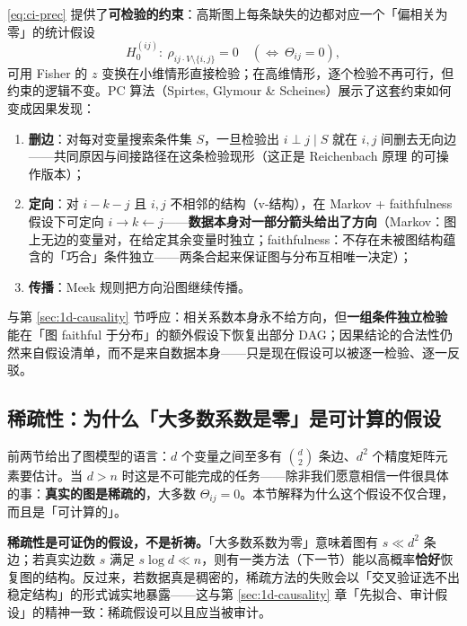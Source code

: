 \eqref{eq:ci-prec} 提供了\textbf{可检验的约束}：高斯图上每条缺失的边都对应一个「偏相关为零」的统计假设
\begin{equation}\label{eq:ci-test}
  H_0^{(ij)}:\ \rho_{ij\cdot V\setminus\{i,j\}} = 0
  \quad(\Longleftrightarrow\ \Theta_{ij} = 0),
\end{equation}
可用 Fisher 的 $z$ 变换在小维情形直接检验；在高维情形，逐个检验不再可行，但约束的逻辑不变。PC 算法（Spirtes, Glymour \& Scheines）展示了这套约束如何变成因果发现\cite{spirtes2000}：

\begin{enumerate}[label=(\alph*)]
  \item \textbf{删边}：对每对变量搜索条件集 $S$，一旦检验出 $i \perp j \mid S$ 就在 $i,j$ 间删去无向边——共同原因与间接路径在这条检验现形（这正是 Reichenbach 原理 \cite{reichenbach1956} 的可操作版本）；
  \item \textbf{定向}：对 $i - k - j$ 且 $i, j$ 不相邻的结构（v-结构），在 Markov + faithfulness 假设下可定向 $i \to k \leftarrow j$——\textbf{数据本身对一部分箭头给出了方向}（Markov：图上无边的变量对，在给定其余变量时独立；faithfulness：不存在未被图结构蕴含的「巧合」条件独立——两条合起来保证图与分布互相唯一决定）；
  \item \textbf{传播}：Meek 规则把方向沿图继续传播。
\end{enumerate}

与第 \ref{sec:1d-causality} 节呼应：相关系数本身永不给方向，但\textbf{一组条件独立检验}能在「图 faithful 于分布」的额外假设下恢复出部分 DAG；因果结论的合法性仍然来自假设清单，而不是来自数据本身——只是现在假设可以被逐一检验、逐一反驳。

\subsection{稀疏性：为什么「大多数系数是零」是可计算的假设}\label{sec:sparsity}

前两节给出了图模型的语言：$d$ 个变量之间至多有 $\binom{d}{2}$ 条边、$d^2$ 个精度矩阵元素要估计。当 $d > n$ 时这是不可能完成的任务——除非我们愿意相信一件很具体的事：\textbf{真实的图是稀疏的}，大多数 $\Theta_{ij} = 0$。本节解释为什么这个假设不仅合理，而且是「可计算的」。

\textbf{稀疏性是可证伪的假设，不是祈祷。}「大多数系数为零」意味着图有 $s \ll d^2$ 条边；若真实边数 $s$ 满足 $s \log d \ll n$，则有一类方法（下一节）能以高概率\textbf{恰好}恢复图的结构。反过来，若数据真是稠密的，稀疏方法的失败会以「交叉验证选不出稳定结构」的形式诚实地暴露——这与第 \ref{sec:1d-causality} 章「先拟合、审计假设」的精神一致：稀疏假设可以且应当被审计。

